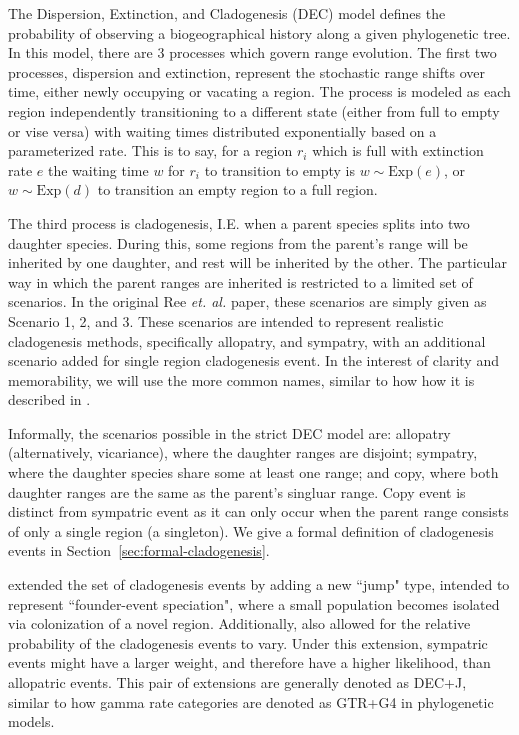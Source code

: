 \documentclass[a4paper]{article}
\begin{document}
The Dispersion, Extinction, and Cladogenesis (DEC) model defines the probability of observing a biogeographical
history along a given phylogenetic tree.
In this model, there are 3 processes which govern range evolution.
The first two processes, dispersion and extinction, represent the stochastic range shifts over time, either newly
occupying or vacating a region.
The process is modeled as each region independently transitioning to a different state (either from full to empty or
vise versa) with waiting times distributed exponentially based on a parameterized rate.
This is to say, for a region \( r_i \) which is full with extinction rate \( e \) the waiting time \( w \) for \( r_i \)
to transition to empty is \( w \sim \text{Exp}(e) \), or $w \sim \text{Exp}(d)$ to transition an empty region to a full
region.

The third process is cladogenesis, I.E. when a parent species splits into two daughter species.
During this, some regions from the parent's range will be inherited by one daughter, and rest will be inherited by the
other.
The particular way in which the parent ranges are inherited is restricted to a limited set of scenarios.
In the original Ree \textit{et. al.}\cite{ALikelihoodFrReeR2005} paper, these scenarios are simply given as Scenario 1,
2, and 3.
These scenarios are intended to represent realistic cladogenesis methods, specifically allopatry, and sympatry, with an
additional scenario added for single region cladogenesis event.
In the interest of clarity and memorability, we will use the more common names, similar to how
how it is described in \citet{ModelSelectionMatzke2014}.

Informally, the scenarios possible in the strict DEC model are: allopatry (alternatively, vicariance), where the
daughter ranges are disjoint; sympatry, where the daughter species share some at least one range; and copy, where both
daughter ranges are the same as the parent's singluar range.
Copy event is distinct from sympatric event as it can only occur when the parent range consists of only a single region
(a singleton).
We give a formal definition of cladogenesis events in Section~\ref{sec:formal-cladogenesis}.

\citet{ModelSelectionMatzke2014} extended the set of cladogenesis events by adding a new ``jump" type, intended to
represent ``founder-event speciation", where a small population becomes isolated via colonization of a novel region.
Additionally, \citet{ModelSelectionMatzke2014} also allowed for the relative probability of the cladogenesis events to
vary.
Under this extension, sympatric events might have a larger weight, and therefore have a higher likelihood, than
allopatric events.
This pair of extensions are generally denoted as DEC+J, similar to how gamma rate categories are denoted as GTR+G4 in
phylogenetic models.
\end{document}
